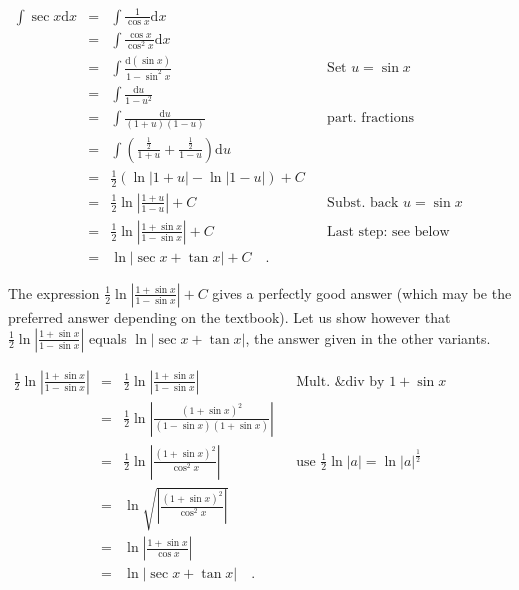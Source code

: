 {$\begin{array}{rcll|l}
\displaystyle \int \sec x \text{d} x&=&\displaystyle \int \frac{1}{\cos x}\text{d} x\\
&=&\displaystyle \int \frac{\cos x}{\cos^2x}\text{d} x\\
&=&\displaystyle \int \frac{\text{d} (\sin x)}{1-\sin^2x}&&\text{Set }u=\sin x\\
&=&\displaystyle \int \frac{\text{d} u}{1-u^2}\\
&=&\displaystyle \int \frac{\text{d} u}{(1+u)(1-u)}&&\text{part. fractions}\\
&=&\displaystyle \int \left(\frac{\frac{1}{2}}{1+u} +\frac{ \frac{1}{ 2}}{1 -u} \right)\text{d} u \\
&=&\displaystyle \frac{1}{2}\left(\ln |1+u|-\ln|1-u| \right)+C\\
&=&\displaystyle \frac{1}{2}\ln \left|\frac{1+u}{1-u} \right|+C &&\text{Subst. back } u=\sin x \\
&=&\displaystyle \frac{1}{2} \ln \left|\frac{1+\sin x}{1-\sin x}\right|+C&&\text{Last step: see below}\\
&=&\displaystyle \ln|\sec x+\tan x|+C\quad .
\end{array}
$

The expression $\displaystyle \frac{1}{2} \ln \left|\frac{1+\sin x}{1-\sin x}\right|+C$ gives a perfectly good answer (which may be the preferred answer depending on the textbook). Let us show however that $\displaystyle \frac{1}{2} \ln \left|\frac{1+\sin x}{1-\sin x}\right|$ equals $\displaystyle \ln |\sec x+\tan x|$, the answer given in the other variants.

$\begin{array}{rcll|l}
\displaystyle \frac{1}{2}  \ln \left|\frac{1+\sin x}{1-\sin x}\right|&=&\displaystyle  \frac{1}{2} \ln \left|\frac{1+\sin x}{1-\sin x}\right| &&\text{Mult. \& div by } 1+\sin x\\
&=&\displaystyle \frac{1}{2}\ln \left|\frac{(1+\sin x)^2}{(1-\sin x)(1+\sin x)}\right|\\
&=&\displaystyle \frac{1}{2}\ln \left|\frac{(1+\sin x)^2}{\cos^2x}\right|&& \text{use }\frac{1}{2}\ln |a|= \ln |a|^{\frac{1}{2}}\\
&=&\displaystyle \ln \sqrt{\left|\frac{(1+\sin x)^2}{\cos^2x}\right|}\\
&=&\displaystyle \ln \left|\frac{1+\sin x}{\cos x}\right|\\
&=&\displaystyle \ln |\sec x +\tan x|\quad .
\end{array}
$

}

